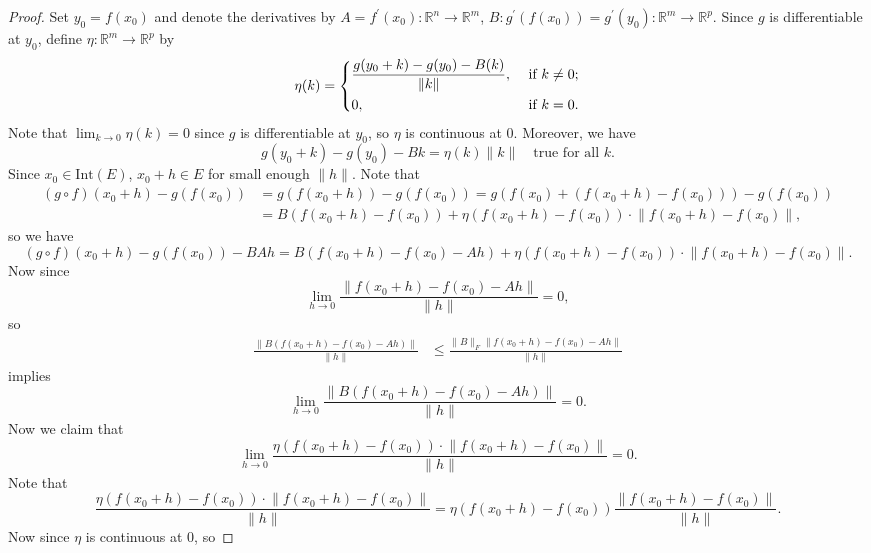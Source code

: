 \begin{proof}
    Set \(y_0 = f(x_0)\) and denote the derivatives by \(A = f^{\prime} (x_0) : \mathbb{R} ^n \to \mathbb{R} ^m\), \(B : g^{\prime} (f(x_0)) = g^{\prime} (y_0): \mathbb{R} ^m \to \mathbb{R} ^p\). Since \(g\) is differentiable at \(y_0\), define \(\eta : \mathbb{R} ^m \to \mathbb{R} ^p\) by 
    \[
        \eta (k) = \begin{dcases}
            \frac{g(y_0 + k) - g(y_0) - B(k)}{\lVert k \rVert }, &\text{ if } k \neq 0 ;\\
            0, &\text{ if } k = 0.
        \end{dcases}
    \]      
    Note that \(\lim_{k \to 0} \eta (k) = 0\) since \(g\) is differentiable at \(y_0\), so \(\eta \) is continuous at \(0\). Moreover, we have 
    \[
        g(y_0 + k) - g(y_0) - Bk = \eta (k) \lVert k \rVert \quad \text{true for all }k. 
    \] 
    Since \(x_0 \in \mathrm{Int}(E) \), \(x_0 + h \in E\) for small enough \(\lVert h \rVert \). Note that 
    \begin{align*}
        \left( g \circ f \right)(x_0 + h) - g(f(x_0)) &= g(f(x_0 + h)) - g(f(x_0)) = g(f(x_0) + (f(x_0 + h) - f(x_0))) - g(f(x_0)) \\
        &= B(f(x_0 + h) - f(x_0)) + \eta \left( f(x_0 + h) - f(x_0) \right) \cdot \lVert f(x_0 + h) - f(x_0) \rVert,   
    \end{align*}
    so we have 
    \[
        (g \circ f)(x_0 + h) - g(f(x_0)) - BAh = B(f(x_0 + h) - f(x_0) - Ah) + \eta \left( f(x_0 + h) - f(x_0) \right) \cdot \lVert f(x_0 + h) - f(x_0) \rVert. 
    \]    
    Now since 
    \[
        \lim_{h \to 0} \frac{\lVert f(x_0 + h) - f(x_0) - Ah \rVert }{\lVert h \rVert } = 0, 
    \]
    so 
    \begin{align*}
        \frac{\lVert B(f(x_0 + h) - f(x_0) - Ah) \rVert }{\lVert h \rVert } &\le \frac{\lVert B \rVert_F \lVert f(x_0 + h) - f(x_0) - A h \rVert  }{\lVert h \rVert } 
    \end{align*} 
    implies 
    \[
        \lim_{h \to 0} \frac{\lVert B(f(x_0 + h) - f(x_0) - Ah) \rVert }{\lVert h \rVert } = 0.  
    \]
    Now we claim that 
    \[
        \lim_{h \to 0} \frac{\eta \left( f(x_0 + h) - f(x_0) \right) \cdot \lVert f(x_0 + h) - f(x_0) \rVert}{\lVert h \rVert } = 0. 
    \]
    Note that 
    \[
       \frac{\eta \left( f(x_0 + h) - f(x_0) \right) \cdot \lVert f(x_0 + h) - f(x_0) \rVert}{\lVert h \rVert } = \eta \left( f(x_0 + h) - f(x_0) \right) \frac{ \lVert f(x_0 + h) - f(x_0) \rVert}{\lVert h \rVert }. 
    \]
    Now since \(\eta \) is continuous at \(0\), so

\end{proof}
